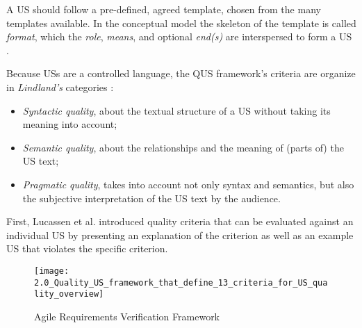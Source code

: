 A US should follow a pre-defined, agreed template, chosen from the many templates available. In the conceptual model the skeleton of the template is called \emph{format}, which the \emph{role}, \emph{means}, and optional \emph{end(s)} are interspersed to form a US \cite{wautelet2014unifying}. 

Because USs are a controlled language, the QUS framework’s criteria are organize in \emph{Lindland’s} categories \cite{lindland1994understanding}:

\begin{itemize}
\item\emph{ Syntactic quality}, about the textual structure of a US without taking its meaning into account;
\item\emph{Semantic quality}, about the relationships and the meaning of (parts of) the US text;
\item\emph{Pragmatic quality}, takes into account not only syntax and semantics, but also the subjective interpretation of the US text by the audience.
\end{itemize}

First, Lucassen et al. introduced quality criteria that can be evaluated against an individual US by presenting an explanation of the criterion as well as an example US that violates the specific criterion.


\begin{figure}[h]
\center
\texttt{[image: 2.0\_Quality\_US\_framework\_that\_define\_13\_criteria\_for\_US\_quality\_overview]}
\caption{Agile Requirements Verification Framework \cite{lucassen2016improving}}\label{fig:qus_framework}
\end{figure}

